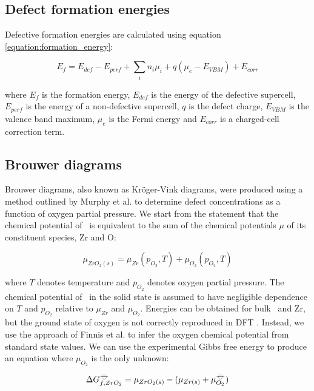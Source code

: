 \subsection{Defect formation energies}

Defective formation energies are calculated using equation \ref{equation:formation_energy}:

\begin{equation} \label{equation:formation_energy}
    E_{f} = E_{def} - E_{perf} + \sum_{i} n_i\mu_i + q(\mu_{e} - E_{VBM}) + E_{corr}
\end{equation}

where $E_{f}$ is the formation energy, $E_{def}$ is the energy of the defective supercell, $E_{perf}$ is the energy of a non-defective supercell, $q$ is the defect charge, $E_{VBM}$ is the valence band maximum, $\mu_{e}$ is the Fermi energy and $E_{corr}$ is a charged-cell correction term.

\subsection{Brouwer diagrams}

Brouwer diagrams, also known as Kr{\"o}ger-Vink diagrams, were produced using a method outlined by Murphy et al. \cite{Murphy2014} to determine defect concentrations as a function of oxygen partial pressure. We start from the statement that the chemical potential of \zirconia\ is equivalent to the sum of the chemical potentials $\mu$ of its constituent species, Zr and O:

\begin{equation}
{\mu}_{ZrO_2(s)} = {\mu}_{Zr}(p_{O_2}, T) + {\mu}_{O_2}(p_{O_2}, T)
\label{mewZrO2results1}
\end{equation}

where $T$ denotes temperature and $p_{O_2}$ denotes oxygen partial pressure. The chemical potential of \zirconia\ in the solid state is assumed to have negligible dependence on $T$ and $p_{O_2}$ relative to ${\mu}_{Zr}$ and ${\mu}_{O_2}$. Energies can be obtained for bulk \zirconia\ and Zr, but the ground state of oxygen is not correctly reproduced in DFT \cite{Batyrev2000,Lozovoi2001}. Instead, we use the approach of Finnis et al. \cite{Finnis2005} to infer the oxygen chemical potential from standard state values. We can use the experimental Gibbs free energy to produce an equation where $\mu_{O_2}$ is the only unknown:

\begin{equation}
\Delta{G^{{\ensuremath{-\kern-4pt{\ominus}\kern-4pt-}}}_{f, ZrO_2}} = \mu_{ZrO_2(s)} - (\mu_{Zr(s)} + \mu^{{-\kern-4pt{\ominus}\kern-4pt-}}_{O_2})
\end{equation}

